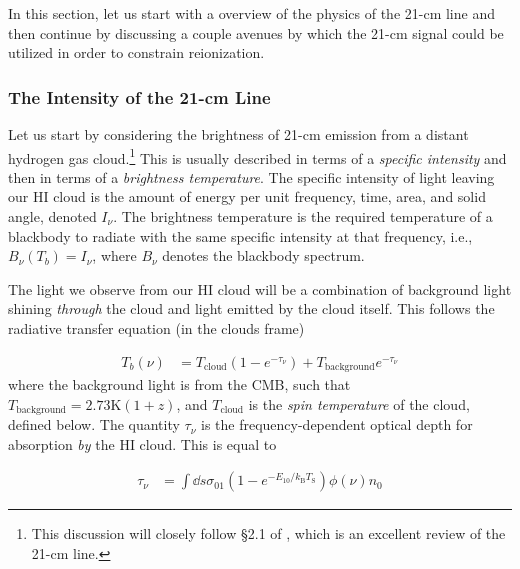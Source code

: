 In this section, let us start with a overview of the physics of the 21-cm line and then continue by discussing a couple avenues by which the 21-cm signal could be utilized in order to constrain reionization. 

\clearpage
\subsubsection{The Intensity of the 21-cm Line}\label{sec:21cmPhysics}


Let us start by considering the brightness of 21-cm emission from a distant hydrogen gas cloud.\footnote{This discussion will closely follow \S 2.1 of \citealt{Furlanetto2006}, which is an excellent review of the 21-cm line.} This is usually described in terms of a \textit{specific intensity} and then in terms of a \textit{brightness temperature}. The specific intensity of light leaving our HI cloud is the amount of energy per unit frequency, time, area, and solid angle, denoted $I_{\nu}$. The brightness temperature is the required temperature of a blackbody to radiate with the same specific intensity at that frequency, i.e., $B_{\nu}(T_b) = I_{\nu}$, where $B_{\nu}$ denotes the blackbody spectrum. 


The light we observe from our HI cloud will be a combination of background light shining \textit{through} the cloud and light emitted by the cloud itself. This follows the radiative transfer equation (in the clouds frame)

\begin{align}
T_b(\nu) &= T_{\text{cloud}}(1-e^{-\tau_{\nu}}) + T_{\text{background}}e^{-\tau_{\nu}} \label{eq:cloudframe}
\end{align}
where the background light is from the CMB, such that $T_{\text{background}} = 2.73\text{K}(1+z)$, and $T_{\text{cloud}}$ is the \textit{spin temperature} of the cloud, defined below. The quantity $\tau_{\nu}$ is the frequency-dependent optical depth for absorption \textit{by} the HI cloud. This is equal to 

\begin{align}
\tau_{\nu} &= \int \dd s \sigma_{01}\left( 1 - e^{-E_{10}/k_{\text{B}}T_{\text{S}}} \right) \phi(\nu) n_{0} \label{eq:tau21}
\end{align}

